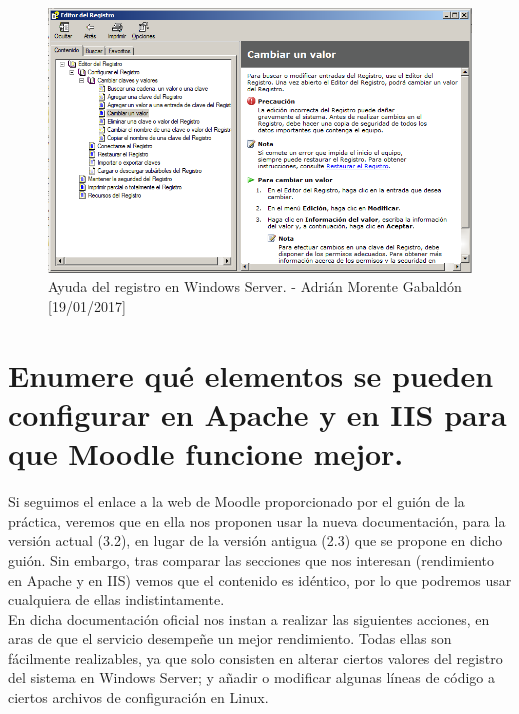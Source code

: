 	\begin{figure}[H]
		\centering
		\includegraphics[scale=0.5]{regedit-help}
		\caption{Ayuda del registro en Windows Server. - Adrián Morente Gabaldón [19/01/2017]}
		\label{figura12}
	\end{figure}



\section{Enumere qué elementos se pueden configurar en Apache y en IIS para que Moodle funcione mejor.}
Si seguimos el enlace a la web de Moodle proporcionado por el guión de la práctica, veremos que en ella nos proponen usar la nueva documentación, para la versión actual (3.2), en lugar de la versión antigua (2.3) que se propone en dicho guión. Sin embargo, tras comparar las secciones que nos interesan (rendimiento en Apache y en IIS) vemos que el contenido es idéntico, por lo que podremos usar cualquiera de ellas indistintamente. \\
En dicha documentación oficial nos instan a realizar las siguientes acciones, en aras de que el servicio desempeñe un mejor rendimiento. Todas ellas son fácilmente realizables, ya que solo consisten en alterar ciertos valores del registro del sistema en Windows Server; y añadir o modificar algunas líneas de código a ciertos archivos de configuración en Linux.

